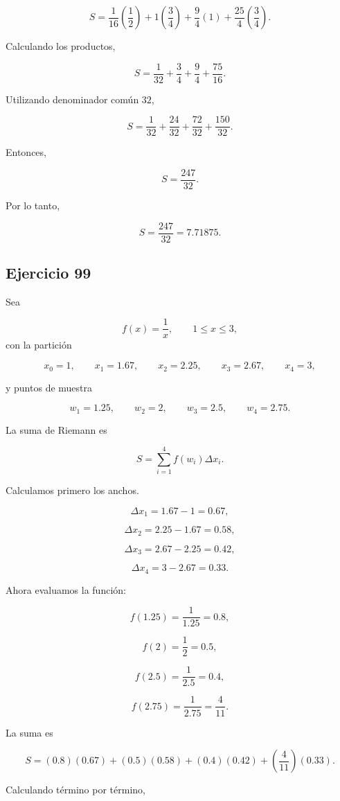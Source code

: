 \documentclass[12pt]{article}
\begin{document}
\[
S
=
\frac1{16}\left(\frac12\right)
+
1\left(\frac34\right)
+
\frac94(1)
+
\frac{25}{4}\left(\frac34\right).
\]

Calculando los productos,

\[
S
=
\frac1{32}
+
\frac34
+
\frac94
+
\frac{75}{16}.
\]

Utilizando denominador común \(32\),

\[
S
=
\frac1{32}
+
\frac{24}{32}
+
\frac{72}{32}
+
\frac{150}{32}.
\]

Entonces,

\[
S
=
\frac{247}{32}.
\]

Por lo tanto,

\[
\boxed{
S=\frac{247}{32}=7.71875
}.
\]

\subsection*{Ejercicio 99}

Sea

\[
f(x)=\frac1x,
\qquad
1\leq x\leq 3,
\]
con la partición

\[
x_0=1,\qquad
x_1=1.67,\qquad
x_2=2.25,\qquad
x_3=2.67,\qquad
x_4=3,
\]

y puntos de muestra

\[
w_1=1.25,\qquad
w_2=2,\qquad
w_3=2.5,\qquad
w_4=2.75.
\]

La suma de Riemann es

\[
S=
\sum_{i=1}^{4}
f(w_i)\Delta x_i.
\]

Calculamos primero los anchos.

\[
\Delta x_1
=
1.67-1
=
0.67,
\]

\[
\Delta x_2
=
2.25-1.67
=
0.58,
\]

\[
\Delta x_3
=
2.67-2.25
=
0.42,
\]

\[
\Delta x_4
=
3-2.67
=
0.33.
\]

Ahora evaluamos la función:

\[
f(1.25)
=
\frac{1}{1.25}
=
0.8,
\]

\[
f(2)=\frac12=0.5,
\]

\[
f(2.5)
=
\frac1{2.5}
=
0.4,
\]

\[
f(2.75)
=
\frac{1}{2.75}
=
\frac4{11}.
\]

La suma es

\[
S
=
(0.8)(0.67)
+
(0.5)(0.58)
+
(0.4)(0.42)
+
\left(\frac4{11}\right)(0.33).
\]

Calculando término por término,
\end{document}
